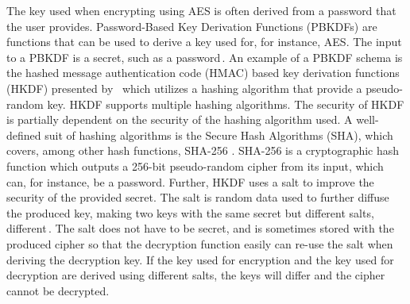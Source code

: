 The key used when encrypting using AES is often derived from a password that the user provides. Password-Based Key Derivation Functions (PBKDFs) are functions that can be used to derive a key used for, for instance, AES. The input to a PBKDF is a secret, such as a password\,\cite{kodwaniSecurityKeyDerivation2021}. An example of a PBKDF schema is the hashed message authentication code (\gls{HMAC}) based key derivation functions (\gls{HKDF}) presented by \citeauthor{krawczykCryptographicExtractionKey2010}\,\cite{krawczykCryptographicExtractionKey2010}\cite{krawczykHMACbasedExtractandExpandKey2010} which utilizes a hashing algorithm that provide a pseudo-random key. HKDF supports multiple hashing algorithms. The security of HKDF is partially dependent on the security of the hashing algorithm used. A well-defined suit of hashing algorithms is the Secure Hash Algorithms (\gls{SHA}), which covers, among other hash functions, SHA-256 \cite{hansenUSSecureHash2011}. SHA-256 is a cryptographic hash function which outputs a 256-bit pseudo-random cipher from its input, which can, for instance, be a password. Further, HKDF uses a salt to improve the security of the provided secret. The salt is random data used to further diffuse the produced key, making two keys with the same secret but different salts, different\,\cite{ariasAddingSaltHashing2021}. The salt does not have to be secret, and is sometimes stored with the produced cipher so that the decryption function easily can re-use the salt when deriving the decryption key. If the key used for encryption and the key used for decryption are derived using different salts, the keys will differ and the cipher cannot be decrypted.
